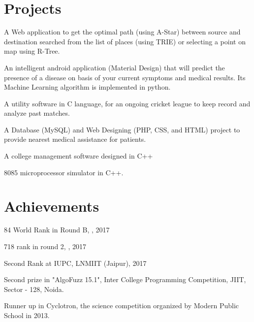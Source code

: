 \documentclass[]{hieudo-build}
\begin{document}
\begin{minipage}[t]{0.69\textwidth}
\section{Projects}

\descript{}
A Web application to get the optimal path (using A-Star) between source and destination searched from the list of places (using TRIE) or selecting a point on map using R-Tree.
\sectionsep

\descript{}
An intelligent android application (Material Design) that will predict the presence of a disease on basis of your current symptoms and medical results. Its Machine Learning algorithm is implemented in python.
\sectionsep

\descript{}
A utility software in C language, for an ongoing cricket league to keep record and analyze past matches.
\sectionsep 

\descript{}
A Database (MySQL) and Web Designing (PHP, CSS, and HTML) project to provide nearest medical assistance for patients.
\sectionsep

\descript{}
A college management software designed in C++%
\sectionsep 

\descript{}
8085 microprocessor simulator in C++.
\sectionsep 



\section{Achievements}

\vspace{0.5em} 
\begin{tightemize}

\item 84 World Rank in Round B, , 2017
\item 718 rank in round 2, , 2017
\item Second Rank at IUPC, LNMIIT (Jaipur), 2017
\item Second prize in "AlgoFuzz 15.1", Inter College Programming Competition, JIIT, Sector - 128, Noida.
\item Runner up in Cyclotron, the science competition organized by Modern Public School in 2013.
\end{tightemize}
\sectionsep




\end{minipage}
\end{document}
